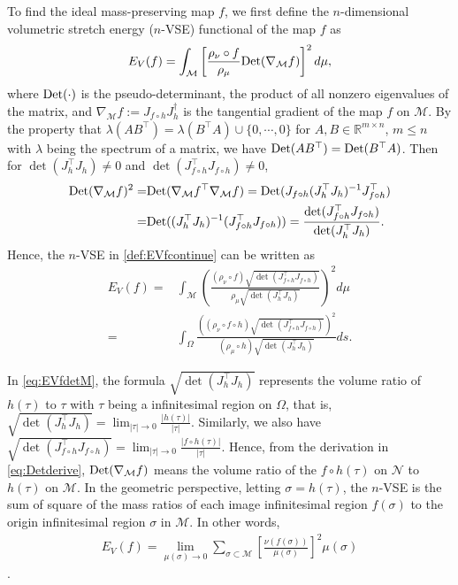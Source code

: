 \documentclass{article}
\begin{document}
To find the ideal mass-preserving map $f$, we first define the $n$-dimensional volumetric stretch energy ($n$-VSE) functional of the map $f$ as
\begin{align} \label{def:EVfcontinue}
    E_V(f) = \int_\mathcal{M} \left[\frac{\rho_{\nu} \circ f}{\rho_\mu} {\rm Det}(\nabla_\mathcal{M} f)\right]^2 d\mu,
\end{align}
where ${\rm Det}(\cdot)$ is the pseudo-determinant, the product of all nonzero eigenvalues of the matrix, and $\nabla_\mathcal{M} f := J_{f\circ h} J_{h}^\dag$ is the tangential gradient of the map $f$ on $\mathcal{M}$. By the property that $\lambda(AB^\top) = \lambda(B^\top A)\cup \{0,\cdots,0\}$ for $A,B \in \mathbb{R}^{m\times n}$, $m \leq n$ with $\lambda$ being the spectrum of a matrix, we have ${\rm Det}(AB^\top) = {\rm Det}(B^\top A)$. Then for $\det(J_{h}^\top J_h) \neq 0$ and $\det(J_{f\circ h}^\top J_{f\circ h}) \neq 0$,
\begin{align}
    {\rm Det}(\nabla_\mathcal{M} f)^2
    =& {\rm Det}(\nabla_\mathcal{M} f^\top \nabla_\mathcal{M} f)
    = {\rm Det}(J_{f\circ h} (J_{h}^\top J_h)^{-1} J_{f\circ h}^\top) \\
    =& {\rm Det}((J_{h}^\top J_h)^{-1} (J_{f\circ h}^\top J_{f\circ h}))
    = \frac{\det(J_{f\circ h}^\top J_{f\circ h})}{\det(J_{h}^\top J_h)}. \label{eq:Detderive}
\end{align}
Hence, the $n$-VSE in \eqref{def:EVfcontinue} can be written as
\begin{align}
    E_V(f) =& \int_\mathcal{M} \left(\frac{ (\rho_{\nu} \circ f )\sqrt{\det(J_{f\circ h}^\top J_{f\circ h})} }{\rho_\mu \sqrt{\det(J_{h}^\top J_h)}} \right)^2 d\mu \label{eq:EVfdetM} \\
    =& \int_\Omega \frac{\left( (\rho_{\nu} \circ f \circ h)\sqrt{\det(J_{f\circ h}^\top J_{f\circ h})} \right)^2}{(\rho_\mu \circ h) \sqrt{\det(J_{h}^\top J_h)}} ds.\label{eq:EVfdet}
\end{align}

\begin{remark}

In \eqref{eq:EVfdetM}, the formula $\sqrt{\det(J_{h}^\top J_h)}$ represents the volume ratio of $h(\tau)$ to $\tau$ with $\tau$ being a infinitesimal region on $\Omega$, that is, $\sqrt{\det(J_{h}^\top J_h)} = \lim_{|\tau| \to 0} \frac{|h(\tau)|}{|\tau|}$. Similarly, we also have $\sqrt{\det(J_{f\circ h}^\top J_{f\circ h})} = \lim_{|\tau| \to 0} \frac{|f\circ h(\tau)|}{|\tau|}$. Hence, from the derivation in \eqref{eq:Detderive}, $ {\rm Det}(\nabla_\mathcal{M} f) $ means the volume ratio of the $f\circ h(\tau)$ on $\mathcal{N}$ to $h(\tau)$ on $\mathcal{M}$. In the geometric perspective, letting $\sigma = h(\tau)$, the $n$-VSE is the sum of square of the mass ratios of each image infinitesimal region $f(\sigma)$ to the origin infinitesimal region $\sigma$ in $\mathcal{M}$. In other words,
\begin{align}
    E_V(f) = \lim_{\mu(\sigma) \to 0} \sum_{\sigma \subset \mathcal{M}} \left[ \frac{\nu(f(\sigma))}{\mu(\sigma)} \right]^2 \mu(\sigma)
\end{align}.
\end{remark}
\end{document}
